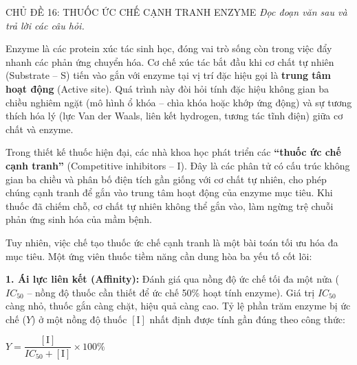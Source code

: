 \documentclass[12pt,a4paper,twoside]{article}
\newcounter{qcounter}
\newenvironment{readingpassage}[1][]{%
    \begin{tcolorbox}[enhanced, colback=grayLight, colframe=secondaryBlue,
        coltitle=textDark, fonttitle=\bfseries, title={#1},
        rounded corners, arc=3mm, boxrule=1pt,
        left=15pt, right=15pt, top=10pt, bottom=10pt,
        breakable, before skip=10pt, after skip=10pt, drop fuzzy shadow]
    \setstretch{1.3}
}{\end{tcolorbox}}
\begin{document}


\newpage
\setcounter{qcounter}{0}

\label{b1_cd16}
\begin{topicbox}{\large CHỦ ĐỀ 16: THUỐC ỨC CHẾ CẠNH TRANH ENZYME}
\vspace{8pt}
\textit{Đọc đoạn văn sau và trả lời các câu hỏi.}
\end{topicbox}
\vspace{5pt}
\begin{readingpassage}[]


Enzyme là các protein xúc tác sinh học, đóng vai trò sống còn trong việc đẩy nhanh các phản ứng chuyển hóa. Cơ chế xúc tác bắt đầu khi cơ chất tự nhiên (Substrate -- S) tiến vào gắn với enzyme tại vị trí đặc hiệu gọi là \textbf{trung tâm hoạt động} (Active site). Quá trình này đòi hỏi tính đặc hiệu không gian ba chiều nghiêm ngặt (mô hình ổ khóa -- chìa khóa hoặc khớp ứng động) và sự tương thích hóa lý (lực Van der Waals, liên kết hydrogen, tương tác tĩnh điện) giữa cơ chất và enzyme.

Trong thiết kế thuốc hiện đại, các nhà khoa học phát triển các \textbf{``thuốc ức chế cạnh tranh''} (Competitive inhibitors -- I). Đây là các phân tử có cấu trúc không gian ba chiều và phân bố điện tích gần giống với cơ chất tự nhiên, cho phép chúng cạnh tranh để gắn vào trung tâm hoạt động của enzyme mục tiêu. Khi thuốc đã chiếm chỗ, cơ chất tự nhiên không thể gắn vào, làm ngừng trệ chuỗi phản ứng sinh hóa của mầm bệnh.

Tuy nhiên, việc chế tạo thuốc ức chế cạnh tranh là một bài toán tối ưu hóa đa mục tiêu. Một ứng viên thuốc tiềm năng cần dung hòa ba yếu tố cốt lõi:

\textbf{1. Ái lực liên kết (Affinity):} Đánh giá qua nồng độ ức chế tối đa một nửa ($IC_{50}$ -- nồng độ thuốc cần thiết để ức chế 50\% hoạt tính enzyme). Giá trị $IC_{50}$ càng nhỏ, thuốc gắn càng chặt, hiệu quả càng cao. Tỷ lệ phần trăm enzyme bị ức chế ($Y$) ở một nồng độ thuốc $[\text{I}]$ nhất định được tính gần đúng theo công thức:

\vspace{2pt}
\begin{center}
$Y = \dfrac{[\text{I}]}{IC_{50} + [\text{I}]} \times 100\%$
\end{center}
\vspace{2pt}


\end{readingpassage}
\end{document}
